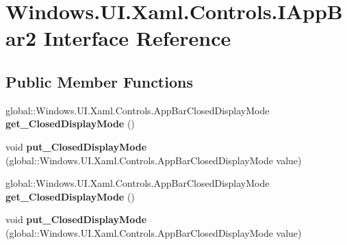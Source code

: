 \hypertarget{interface_windows_1_1_u_i_1_1_xaml_1_1_controls_1_1_i_app_bar2}{}\section{Windows.\+U\+I.\+Xaml.\+Controls.\+I\+App\+Bar2 Interface Reference}
\label{interface_windows_1_1_u_i_1_1_xaml_1_1_controls_1_1_i_app_bar2}
\subsection*{Public Member Functions}
\begin{DoxyCompactItemize}
\item 
\mbox{\label{interface_windows_1_1_u_i_1_1_xaml_1_1_controls_1_1_i_app_bar2_a5c676f47f4b7b2e9ffd1e86aa2d91647}} 
global\+::\+Windows.\+U\+I.\+Xaml.\+Controls.\+App\+Bar\+Closed\+Display\+Mode {\bfseries get\+\_\+\+Closed\+Display\+Mode} ()
\item 
\mbox{\label{interface_windows_1_1_u_i_1_1_xaml_1_1_controls_1_1_i_app_bar2_a49e6938236b9ffe3ed9c3cc9f30ca44f}} 
void {\bfseries put\+\_\+\+Closed\+Display\+Mode} (global\+::\+Windows.\+U\+I.\+Xaml.\+Controls.\+App\+Bar\+Closed\+Display\+Mode value)
\item 
\mbox{\label{interface_windows_1_1_u_i_1_1_xaml_1_1_controls_1_1_i_app_bar2_a5c676f47f4b7b2e9ffd1e86aa2d91647}} 
global\+::\+Windows.\+U\+I.\+Xaml.\+Controls.\+App\+Bar\+Closed\+Display\+Mode {\bfseries get\+\_\+\+Closed\+Display\+Mode} ()
\item 
\mbox{\label{interface_windows_1_1_u_i_1_1_xaml_1_1_controls_1_1_i_app_bar2_a49e6938236b9ffe3ed9c3cc9f30ca44f}} 
void {\bfseries put\+\_\+\+Closed\+Display\+Mode} (global\+::\+Windows.\+U\+I.\+Xaml.\+Controls.\+App\+Bar\+Closed\+Display\+Mode value)
\item 
\mbox{\label{interface_windows_1_1_u_i_1_1_xaml_1_1_controls_1_1_i_app_bar2_a5c676f47f4b7b2e9ffd1e86aa2d91647}} 

\end{DoxyCompactItemize}
